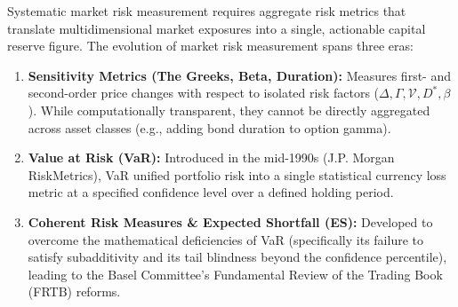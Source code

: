 Systematic market risk measurement requires aggregate risk metrics that translate multidimensional market exposures into a single, actionable capital reserve figure. The evolution of market risk measurement spans three eras:
\begin{enumerate}[leftmargin=1.5em, itemsep=3pt]
    \item \textbf{Sensitivity Metrics (The Greeks, Beta, Duration):} Measures first- and second-order price changes with respect to isolated risk factors ($\Delta, \Gamma, \mathcal{V}, D^*, \beta$). While computationally transparent, they cannot be directly aggregated across asset classes (e.g., adding bond duration to option gamma).
    \item \textbf{Value at Risk (VaR):} Introduced in the mid-1990s (J.P. Morgan RiskMetrics), VaR unified portfolio risk into a single statistical currency loss metric at a specified confidence level over a defined holding period.
    \item \textbf{Coherent Risk Measures \& Expected Shortfall (ES):} Developed to overcome the mathematical deficiencies of VaR (specifically its failure to satisfy subadditivity and its tail blindness beyond the confidence percentile), leading to the Basel Committee's Fundamental Review of the Trading Book (FRTB) reforms.
\end{enumerate}
